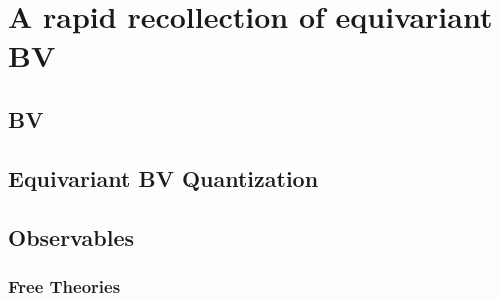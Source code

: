 \section{A rapid recollection of equivariant BV}


\subsection{BV}

\subsection{Equivariant BV Quantization}


\subsection{Observables}\label{sect:eq_obs}

\subsubsection{Free Theories}\label{sect:free}
